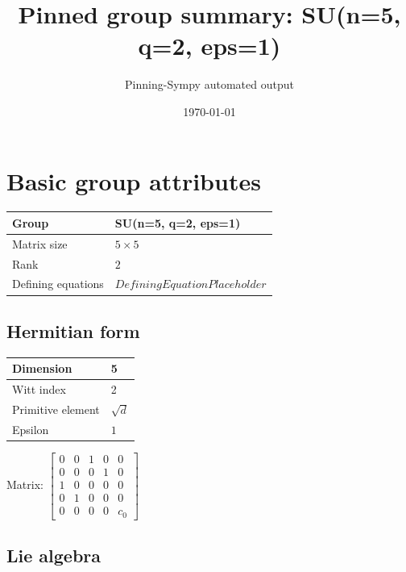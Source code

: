 \documentclass[11pt]{article}
\title{Pinned group summary: SU(n=5, q=2, eps=1)}
\author{Pinning-Sympy automated output}
\date{\today}
\theoremstyle{definition}
\begin{document}
\maketitle
\tableofcontents

\newpage

\section{Basic group attributes}

\begin{tabular}{|l|l|}
	\hline
    Group & SU(n=5, q=2, eps=1) \\
	\hline
    Matrix size & $5 \times 5$ \\
	\hline
    Rank & $2$ \\
	\hline
	Defining equations & $DefiningEquationPlaceholder$ \\
	\hline
\end{tabular}

\subsection{Hermitian form}
\begin{tabular}{|l|l|}
    \hline
    Dimension & 5 \\
    \hline
    Witt index & 2 \\
    \hline
    Primitive element & $\sqrt{d}$ \\
    \hline
    Epsilon & $1$ \\
    \hline
\end{tabular}

\bigskip
\noindent Matrix: \(
\left[\begin{matrix}0 & 0 & 1 & 0 & 0\\0 & 0 & 0 & 1 & 0\\1 & 0 & 0 & 0 & 0\\0 & 1 & 0 & 0 & 0\\0 & 0 & 0 & 0 & c_{0}\end{matrix}\right]
\)



\subsection{Lie algebra}
\end{document}
